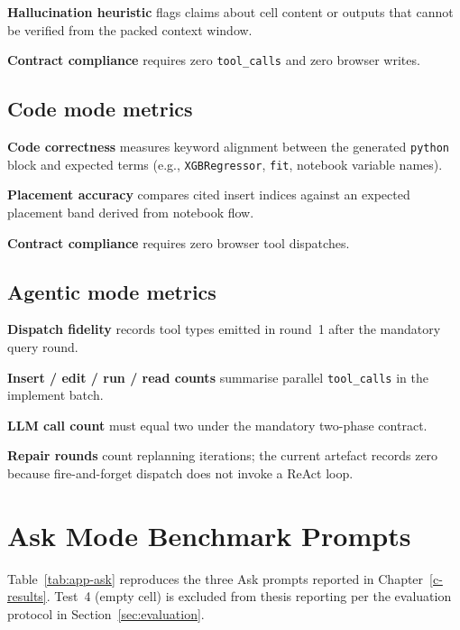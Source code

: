 \textbf{Hallucination heuristic} flags claims about cell content or outputs that cannot be verified from the packed context window.

\textbf{Contract compliance} requires zero \texttt{tool\_calls} and zero browser writes.

\subsection{Code mode metrics}

\textbf{Code correctness} measures keyword alignment between the generated \texttt{python} block and expected terms (e.g., \texttt{XGBRegressor}, \texttt{fit}, notebook variable names).

\pagebreak[4]

\textbf{Placement accuracy} compares cited insert indices against an expected placement band derived from notebook flow.

\textbf{Contract compliance} requires zero browser tool dispatches.

\subsection{Agentic mode metrics}

\textbf{Dispatch fidelity} records tool types emitted in round~1 after the mandatory query round.

\textbf{Insert / edit / run / read counts} summarise parallel \texttt{tool\_calls} in the implement batch.

\textbf{LLM call count} must equal two under the mandatory two-phase contract.

\textbf{Repair rounds} count replanning iterations; the current artefact records zero because fire-and-forget dispatch does not invoke a ReAct loop.

\section{Ask Mode Benchmark Prompts}
\label{app:ask-prompts}

Table~\ref{tab:app-ask} reproduces the three Ask prompts reported in Chapter~\ref{c-results}. Test~4 (empty cell) is excluded from thesis reporting per the evaluation protocol in Section~\ref{sec:evaluation}.

